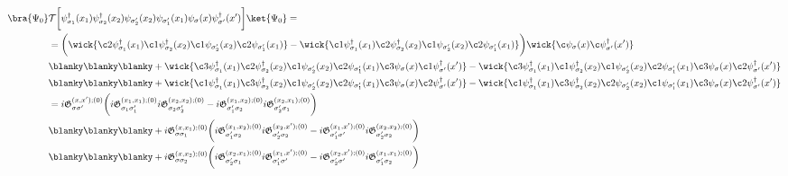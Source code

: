 \begin{equation}
    \begin{split}
        \bra{\Psi_0} &\mathcal{T} \bigg[ \psi_{\sigma_1}^\dagger(x_1) \psi_{\sigma_2}^\dagger(x_2) \psi_{\sigma'_2}(x_2) \psi_{\sigma'_1}(x_1) \psi_{\sigma}(x) \psi^\dagger_{\sigma'}(x') \bigg] \ket{\Psi_0} =\\
        &= \bigg({\wick{ \c2\psi_{\sigma_1}^\dagger(x_1) \c1 \psi_{\sigma_2}^\dagger(x_2) \c1 \psi_{\sigma'_2}(x_2) \c2\psi_{\sigma'_1}(x_1)} 
        }-{\wick{ \c1\psi_{\sigma_1}^\dagger(x_1) \c2 \psi_{\sigma_2}^\dagger(x_2) \c1 \psi_{\sigma'_2}(x_2) \c2\psi_{\sigma'_1}(x_1)} 
        }\bigg) \wick{\c  \psi_{\sigma}(x) \c\psi^\dagger_{\sigma'}(x') } \\
        &\blanky \blanky \blanky+ \wick{
        \c3 \psi_{\sigma_1}^\dagger(x_1) 
        \c2 \psi_{\sigma_2}^\dagger(x_2) 
        \c1 \psi_{\sigma'_2}(x_2) 
        \c2 \psi_{\sigma'_1}(x_1) 
        \c3 \psi_{\sigma}(x) 
        \c1 \psi^\dagger_{\sigma'}(x') } - \wick{\c3 \psi_{\sigma_1}^\dagger(x_1)  \c1 \psi_{\sigma_2}^\dagger(x_2)  \c1 \psi_{\sigma'_2}(x_2) \c2 \psi_{\sigma'_1}(x_1) \c3 \psi_{\sigma}(x) \c2 \psi^\dagger_{\sigma'}(x') } \\
        &\blanky \blanky \blanky + \wick{\c1 \psi_{\sigma_1}^\dagger(x_1) \c3 \psi_{\sigma_2}^\dagger(x_2) \c1 \psi_{\sigma'_2}(x_2) \c2 \psi_{\sigma'_1}(x_1) \c3 \psi_{\sigma}(x) \c2 \psi^\dagger_{\sigma'}(x') } - \wick{\c1 \psi_{\sigma_1}^\dagger(x_1) \c3 \psi_{\sigma_2}^\dagger(x_2) \c2 \psi_{\sigma'_2}(x_2) \c1 \psi_{\sigma'_1}(x_1) \c3 \psi_{\sigma}(x) \c2 \psi^\dagger_{\sigma'}(x') } \\
        &= i{\mathfrak{G}_{\sigma \sigma'}^{(x,x'); (0)}} \bigg(i{\mathfrak{G}_{\sigma_1 \sigma'_1}^{(x_1, x_1); (0)}} i{\mathfrak{G}_{\sigma_2 \sigma'_2 }^{(x_2,x_2); (0)}} - i{\mathfrak{G}_{\sigma'_1\sigma_2}^{(x_1, x_2); (0)}} i{\mathfrak{G}_{\sigma'_2 \sigma_1}^{(x_2, x_1); (0)}}\bigg)  \\
        & \blanky \blanky \blanky + i{\mathfrak{G}_{\sigma \sigma_1}^{(x,x_1); (0)}}\bigg(  i{\mathfrak{G}_{\sigma'_1 \sigma_2}^{(x_1,x_2); (0)}} i{\mathfrak{G}_{\sigma'_2\sigma_2}^{(x_2, x'); (0)}} -  i{\mathfrak{G}_{\sigma'_1 \sigma'}^{(x_1, x'); (0)}} i{\mathfrak{G}_{\sigma'_2 \sigma_2}^{(x_2, x_2); (0)}} \bigg) \\
        & \blanky \blanky \blanky + i{\mathfrak{G}_{\sigma \sigma_2}^{(x, x_2);(0)}} \bigg(i{\mathfrak{G}_{\sigma'_2 \sigma_1}^{(x_2, x_1);(0)}}
        i{\mathfrak{G}_{\sigma'_1 \sigma'}^{(x_1, x');(0)}} - 
        i{\mathfrak{G}_{\sigma'_2 \sigma'}^{(x_2, x');(0)}}
        i{\mathfrak{G}_{\sigma_1' \sigma_2}^{(x_1, x_1);(0)}}\bigg) 
    \end{split}
    \label{first_order_contractions}
\end{equation}


